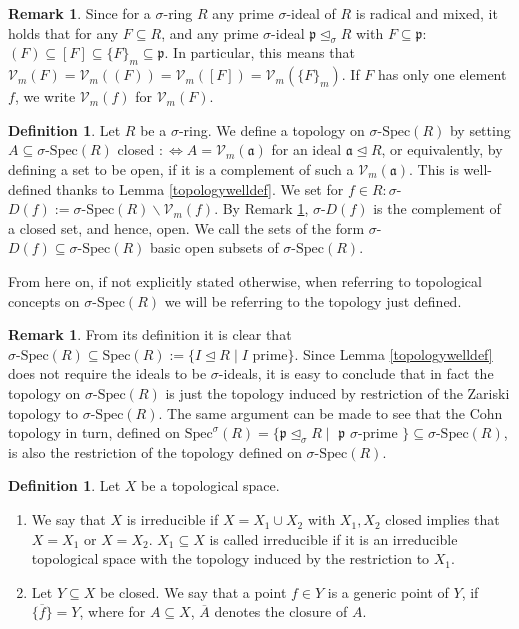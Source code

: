 \documentclass{article}
\def\Vm{\mathcal{V}_m}
\def\a{\mathfrak{a}}
\def\p{\mathfrak{p}}
\def\s{\sigma}
\def\si{\unlhd_{\sigma}}
\def\Spec{\text{Spec}}
\def\sSpec{\sigma\text{-Spec}}
\theoremstyle{definition}
\newtheorem{rem}[Satz]{Remark}
\newtheorem{defn}[Satz]{Definition}
\begin{document}
\begin{rem}\label{vmsequal}
Since for a $\s$-ring $R$ any prime $\s$-ideal of $R$ is radical and mixed, it holds that for any $F \subseteq R$, and any prime $\s$-ideal $\p \si R$ with $F \subseteq \p$:
$(F) \subseteq [F] \subseteq \{ F \}_m \subseteq \p$. In particular, this means that $\Vm(F) = \Vm((F)) = \Vm([F]) = \Vm(\{F\}_m)$. If $F$ has only one element $f$, we write $\Vm(f)$ for $\Vm(F)$.
\end{rem}

\begin{defn}\label{deftop}
Let $R$ be a $\s$-ring. We define a topology on $\sSpec(R)$ by setting $A \subseteq \sSpec(R)$ closed $:\Leftrightarrow A = \Vm(\a)$ for an ideal $\a \unlhd R$, or equivalently,
 by defining a set to be open, if it is a complement of such a $\Vm(\a)$. This is well-defined thanks to Lemma \ref{topologywelldef}.
We set for $f \in R: \s$-$ D(f):= \sSpec(R) \backslash \Vm(f)$. By Remark \ref{vmsequal}, $\s$-$D(f)$ is the complement of a closed set, and hence, open. 
We call the sets of the form $\s$-$D(f) \subseteq \sSpec(R)$ basic open subsets of $\sSpec(R)$.
\end{defn}

From here on, if not explicitly stated otherwise, when referring to topological concepts on $\sSpec(R)$ we will be referring to the topology just defined.

\begin{rem}
From its definition it is clear that $\sSpec(R) \subseteq \Spec(R):= \{ I \unlhd R \mid I \text{ prime} \}$. Since Lemma \ref{topologywelldef} does not require the ideals to be $\s$-ideals, 
it is easy to conclude that in fact the topology on $\sSpec(R)$ is just the topology induced by restriction of the Zariski topology to $\sSpec(R)$. The same argument can be made to see that the Cohn topology in turn,
defined on $\Spec^\s(R) = \{ \p \si R \mid $ $\p$ $ \s$-prime $\} \subseteq \sSpec(R)$, is also the restriction of the topology defined on $\sSpec(R)$. 
\end{rem}

\begin{defn}
Let $X$ be a topological space.
\begin{enumerate}
\item  We say that $X$ is irreducible if $X = X_1 \cup X_2$ with $X_1, X_2$ closed implies that $X = X_1$ or $X = X_2$. 
$X_1 \subseteq X$ is called irreducible if it is an irreducible topological space with the topology induced by the restriction to $X_1$.
\item Let $Y \subseteq X$ be closed. We say that a point $f \in Y$ is a generic point of $Y$, if $\overline{\{  f \} } = Y$, where for $A \subseteq X$, $\overline{A}$ denotes the closure of $A$.

\end{enumerate}
\end{defn}
\end{document}
